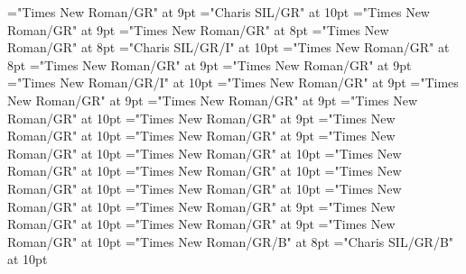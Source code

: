 \documentclass[gps1,twoside]{article}
\begin{document}
\font\formpronunciationpronunciationsentryletData="Times New Roman/GR" at 9pt
\font\spanbzhfonipaformpronunciationpronunciationsentryletData="Charis SIL/GR" at 10pt
\font\examplessensesensecontentsensesentryletData="Times New Roman/GR" at 9pt
\font\exampleexamplessensesensecontentsensesentryletData="Times New Roman/GR" at 8pt
\font\exampleexampleexamplessensesensecontentsensesentryletData="Times New Roman/GR" at 8pt
\font\spanbzhexampleexampleexamplessensesensecontentsensesentryletData="Charis SIL/GR/I" at 10pt
\font\translationsexampleexamplessensesensecontentsensesentryletData="Times New Roman/GR" at 8pt
\font\translationtranslationsexampleexamplessensesensecontentsensesentryletData="Times New Roman/GR" at 9pt
\font\translationtranslationtranslationsexampleexamplessensesensecontentsensesentryletData="Times New Roman/GR" at 9pt
\font\spanentranslationtranslationtranslationsexampleexamplessensesensecontentsensesentryletData="Times New Roman/GR/I" at 10pt
\font\semanticdomainssensesensecontentsensesentryletData="Times New Roman/GR" at 9pt
\font\semanticdomainsemanticdomainssensesensecontentsensesentryletData="Times New Roman/GR" at 9pt
\font\abbreviationsemanticdomainsemanticdomainssensesensecontentsensesentryletData="Times New Roman/GR" at 9pt
\font\spanenabbreviationsemanticdomainsemanticdomainssensesensecontentsensesentryletData="Times New Roman/GR" at 10pt
\font\namesemanticdomainsemanticdomainssensesensecontentsensesentryletData="Times New Roman/GR" at 9pt
\font\spanennamesemanticdomainsemanticdomainssensesensecontentsensesentryletData="Times New Roman/GR" at 10pt
\font\picturesentryletData="Times New Roman/GR" at 9pt
\font\picturepicturesentryletData="Times New Roman/GR" at 10pt
\font\thumbnailpicturepicturesentryletData="Times New Roman/GR" at 10pt
\font\sensenumberpicturepicturesentryletData="Times New Roman/GR" at 10pt
\font\spanensensenumberpicturepicturesentryletData="Times New Roman/GR" at 10pt
\font\captionpicturepicturesentryletData="Times New Roman/GR" at 10pt
\font\captioncaptionpicturepicturesentryletData="Times New Roman/GR" at 10pt
\font\spanencaptioncaptionpicturepicturesentryletData="Times New Roman/GR" at 10pt
\font\scientificnamesensesensecontentsensesentryletData="Times New Roman/GR" at 9pt
\font\spanenscientificnamesensesensecontentsensesentryletData="Times New Roman/GR" at 10pt
\font\subentriesentryletData="Times New Roman/GR" at 9pt
\font\subentrysubentriesentryletData="Times New Roman/GR" at 10pt
\font\headwordsubentrysubentriesentryletData="Times New Roman/GR/B" at 8pt
\font\spanbzhheadwordsubentrysubentriesentryletData="Charis SIL/GR/B" at 10pt
\end{document}

